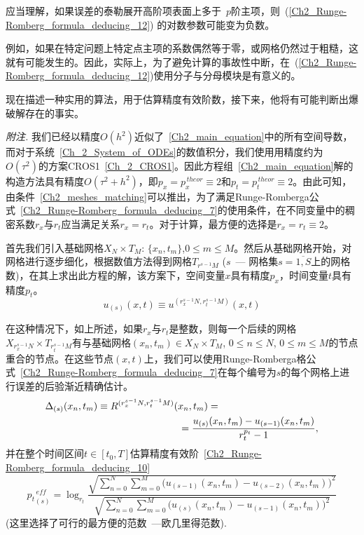 \documentclass[twoside]{book}
\begin{document}
\begin{CJK*}{GBK}{song}
	应当理解，如果误差的泰勒展开高阶项表面上多于~$p$阶主项，则~(\ref{Ch2_Runge-Romberg_formula_deducing_12}) 的对数参数可能变为负数。

	例如，如果在特定问题上特定点主项的系数偶然等于零，或网格仍然过于粗糙，这就有可能发生的。因此，实际上，为了避免计算的事故性中断，在~(\ref{Ch2_Runge-Romberg_formula_deducing_12})使用分子与分母模块是有意义的。
	
	现在描述一种实用的算法，用于估算精度有效阶数，接下来，他将有可能判断出爆破解存在的事实。
	
	\emph{附注.} 我们已经以精度$O(h^2)$近似了~\eqref{Ch2_main_equation}中的所有空间导数，而对于系统~\eqref{Ch_2_System_of_ODEs}的数值积分，我们使用用精度约为~$O(\tau^2)$的方案CROS1~\eqref{Ch_2_CROS1}。因此方程组~\eqref{Ch2_main_equation}解的构造方法具有精度$O(\tau^2 + h^2)$，即$p_x = p_x^{\, theor} \equiv 2$和$p_t = p_t^{\, theor} \equiv 2$。由此可知，由条件~\eqref{Ch2_meshes_matching}可以推出，为了满足Runge-Romberga公式~\eqref{Ch2_Runge-Romberg_formula_deducing_7}的使用条件，在不同变量中的稠密系数$r_x$与$r_t$应当满足关系$r_x = r_t$。对于计算，最方便的选择是$r_x = r_t \equiv 2$。
	
	
	首先我们引入基础网格$X_N \times T_M$: $\{x_n,t_m\}$,$0 \leqslant m \leqslant M$。然后从基础网格开始，对网格进行逐步细化，根据数值方法得到网格$T_{r^{s - 1}M}$ ($s$~--- 网格集$s = \overline{1,S}$上的网格数)，在其上求出此方程的解，该方案下，空间变量$x$具有精度$p_x$，时间变量$t$具有精度$p_t$。
	\begin{equation*}
	u_{(s)}(x,t) \equiv u^{(r_x^{s - 1}N,r_t^{s - 1}M)}(x,t)
	\end{equation*}
	
	在这种情况下，如上所述，如果$r_x$与$r_t$是整数，则每一个后续的网格$X_{r_x^{s - 1}N} \times T_{r_t^{s - 1}M}$有与基础网格$(x_n,t_m) \in X_N \times T_M$, $0 \leqslant n \leqslant N$, $0 \leqslant m \leqslant M$的节点重合的节点。在这些节点$(x,t)$上，我们可以使用Runge-Romberga格公式~\eqref{Ch2_Runge-Romberg_formula_deducing_7}在每个编号为$s$的每个网格上进行误差的后验渐近精确估计。
	\begin{align*}
	&\Delta_{(s)}(x_n,t_m) \equiv R^{(r_x^{s - 1}N,r_t^{s - 1}M)}(x_n,t_m) = \\
	&\hspace{+4.8cm} = \frac{u_{(s)}(x_n,t_m) - u_{(s - 1)}(x_n,t_m)}{r_t^{p_t} - 1},
	\end{align*}
	并在整个时间区间$t \in [t_0,T]$估算精度有效阶~\eqref{Ch2_Runge-Romberg_formula_deducing_10}
	\begin{equation}
	\label{Ch2_p_eff_total}
	{p_t}^{\, eff}_{(s)} = \log_{r_t}{\dfrac{\sqrt{\sum\limits_{n = 0}^N \sum\limits_{m = 0}^M \big(u_{(s - 1)}(x_n,t_m) - u_{(s - 2)}(x_n,t_m)\big)^2}}{\sqrt{\sum\limits_{n = 0}^N\sum\limits_{m = 0}^M  \big(u_{(s)}(x_n,t_m) - u_{(s - 1)}(x_n,t_m)\big)^2}}}
	\end{equation}
	(这里选择了可行的最方便的范数~---欧几里得范数).
	

\end{CJK*}
\end{document}
